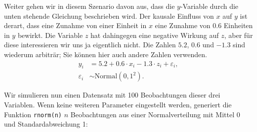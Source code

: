 Weiter gehen wir in diesem Szenario davon aus,
dass die $y$-Variable durch die unten stehende Gleichung beschrieben wird.
Der kausale Einfluss von $x$ auf $y$ ist derart,
dass eine Zunahme von einer Einheit in $x$ eine Zunahme von 0.6 Einheiten
in $y$ bewirkt. Die Variable $z$ hat dahingegen eine negative Wirkung
auf $z$, aber für diese interessieren wir uns ja eigentlich nicht.
Die Zahlen $5.2$, $0.6$ und $-1.3$ sind wiederum arbiträr; Sie können hier auch
andere Zahlen verwenden.
\begin{align}
y_i &= 5.2 + 0.6\cdot x_i - 1.3 \cdot z_i + \varepsilon_i, \label{eq:dag1} \\
\varepsilon_i &\sim \textrm{Normal}(0, 1^2). \nonumber
\end{align}

Wir simulieren nun einen Datensatz mit 100 Beobachtungen dieser
drei Variablen. Wenn keine weiteren Parameter eingestellt werden,
generiert die Funktion \texttt{rnorm(n)} $n$ Beobachtungen aus einer
Normalverteilung mit Mittel 0 und Standardabweichung 1:
\begin{knitrout}
\color{fgcolor}\begin{kframe}
\begin{alltt}
 \hlkwb{<-} 
 \hlkwb{<-} 
 \hlkwb{<-}  \hlopt{+} \hlopt{*} \hlopt{+} 
 \hlkwb{<-}  \hlopt{+} \hlopt{*} \hlopt{-} \hlopt{*} \hlopt{+} 
 \hlkwb{<-} 
\end{alltt}


{\ttfamily\noindent\bfseries{}}\end{kframe}
\end{knitrout}

